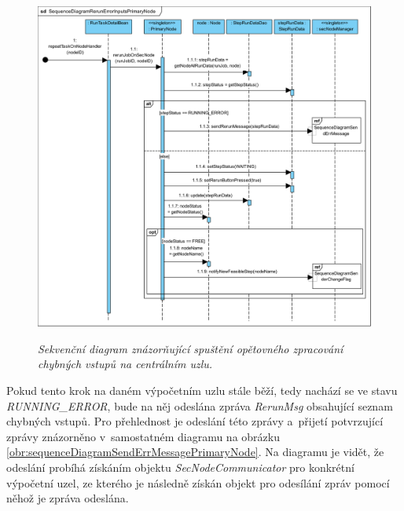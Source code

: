 \begin{figure}[H]
\begin{center}
    \scalebox{0.5}
    {
        \includegraphics{images/SequenceDiagramRerunErrorInputsPrimaryNode.pdf}
    }
    \caption{\label{obr:sequenceDiagramRerunErrorInputsPrimaryNode} {\it Sekvenční diagram znázorňující spuštění opětovného zpracování chybných vstupů na centrálním uzlu.}}
\end{center}
\end{figure}


Pokud tento krok na daném výpočetním uzlu stále běží, tedy nachází se ve stavu \textit{RUNNING\_ERROR}, bude na něj odeslána zpráva \textit{RerunMsg} obsahující seznam chybných vstupů. Pro přehlednost je odeslání této zprávy a~přijetí potvrzující zprávy znázorněno v~samostatném diagramu na obrázku \ref{obr:sequenceDiagramSendErrMessagePrimaryNode}. Na diagramu je vidět, že odeslání probíhá získáním objektu \textit{SecNodeCommunicator} pro konkrétní výpočetní uzel, ze kterého je následně získán objekt pro odesílání zpráv pomocí něhož je zpráva odeslána.

